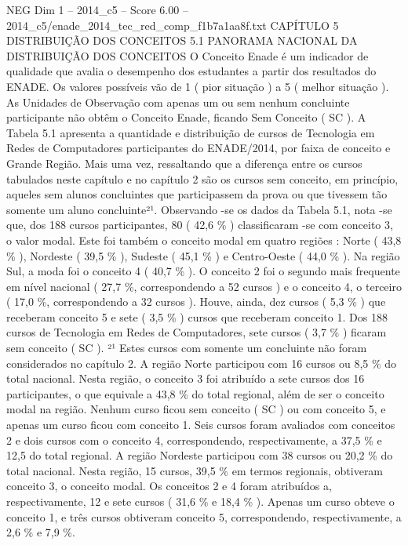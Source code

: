 \begin{textsample}{NEG Dim 1 – 2014\_c5 – Score 6.00 – 2014\_c5/enade\_2014\_tec\_red\_comp\_f1b7a1aa8f.txt}  \label{ex:f1_neg_333}
CAPÍTULO 5 DISTRIBUIÇÃO DOS CONCEITOS 5.1 PANORAMA NACIONAL DA DISTRIBUIÇÃO DOS CONCEITOS O Conceito Enade é um indicador de qualidade que avalia o desempenho dos estudantes a partir dos resultados do ENADE.
Os valores possíveis vão de 1 ( pior situação ) a 5 ( melhor situação ).
As Unidades de Observação com apenas um ou sem nenhum concluinte participante não obtêm o Conceito Enade, ficando Sem Conceito ( SC ).
A Tabela 5.1 apresenta a quantidade e distribuição de cursos de Tecnologia em Redes de Computadores participantes do ENADE/2014, por faixa de conceito e Grande Região.
Mais uma vez, ressaltando que a diferença entre os cursos tabulados neste capítulo e no capítulo 2 são os cursos sem conceito, em princípio, aqueles sem alunos concluintes que participassem da prova ou que tivessem tão somente um aluno concluinte²¹.
Observando -se os dados da Tabela 5.1, nota -se que, dos 188 cursos participantes, 80 ( 42,6 \% ) classificaram -se com conceito 3, o valor modal.
Este foi também o conceito modal em quatro regiões : Norte ( 43,8 \% ), Nordeste ( 39,5 \% ), Sudeste ( 45,1 \% ) e Centro-Oeste ( 44,0 \% ).
Na região Sul, a moda foi o conceito 4 ( 40,7 \% ).
O conceito 2 foi o segundo mais frequente em nível nacional ( 27,7 \%, correspondendo a 52 cursos ) e o conceito 4, o terceiro ( 17,0 \%, correspondendo a 32 cursos ).
Houve, ainda, dez cursos ( 5,3 \% ) que receberam conceito 5 e sete ( 3,5 \% ) cursos que receberam conceito 1.
Dos 188 cursos de Tecnologia em Redes de Computadores, sete cursos ( 3,7 \% ) ficaram sem conceito ( SC ). ²¹ Estes cursos com somente um concluinte não foram considerados no capítulo 2.
A região Norte participou com 16 cursos ou 8,5 \% do total nacional.
Nesta região, o conceito 3 foi atribuído a sete cursos dos 16 participantes, o que equivale a 43,8 \% do total regional, além de ser o conceito modal na região.
Nenhum curso ficou sem conceito ( SC ) ou com conceito 5, e apenas um curso ficou com conceito 1.
Seis cursos foram avaliados com conceitos 2 e dois cursos com o conceito 4, correspondendo, respectivamente, a 37,5 \% e 12,5 do total regional.
A região Nordeste participou com 38 cursos ou 20,2 \% do total nacional.
Nesta região, 15 cursos, 39,5 \% em termos regionais, obtiveram conceito 3, o conceito modal.
Os conceitos 2 e 4 foram atribuídos a, respectivamente, 12 e sete cursos ( 31,6 \% e 18,4 \% ).
Apenas um curso obteve o conceito 1, e três cursos obtiveram conceito 5, correspondendo, respectivamente, a 2,6 \% e 7,9 \%.

\end{textsample}
